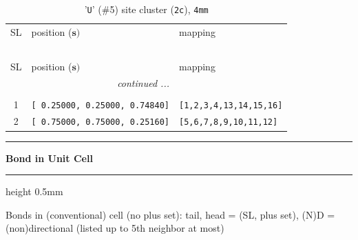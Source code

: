 \documentclass[fleqn,10pt,landscape]{jsarticle}
\begin{document}
\begin{longtable}[l]{cll}
\captionsetup{justification=raggedright, singlelinecheck=off}
\caption{'\texttt{U}' (\#5) site cluster (\texttt{2c}), \texttt{4mm}}
 \\
 \hline \hline
SL & position ($\bm{s})$ & mapping \\ \hline \endfirsthead

\multicolumn{2}{l}{\tablename\ \thetable{}} \\
 \hline \hline
SL & position ($\bm{s})$ & mapping \\ \hline \endhead

 \hline \hline
\multicolumn{2}{r}{\footnotesize\it continued ...} \\ \endfoot

 \hline \hline
\multicolumn{2}{r}{} \\ \endlastfoot

1 & \texttt{[ 0.25000, 0.25000, 0.74840]} & \texttt{[1,2,3,4,13,14,15,16]} \\ \hline
2 & \texttt{[ 0.75000, 0.75000, 0.25160]} & \texttt{[5,6,7,8,9,10,11,12]} \\
\end{longtable}
\vspace{5mm}
\noindent \rule[0.5mm]{5mm}{0.5mm}\hspace{3mm}\textbf{Bond in Unit Cell}\hspace{3mm}\leaders\hrule height 0.5mm\hfill\kern0pt
\vspace{3mm}

\noindent Bonds in (conventional) cell (no plus set): tail, head = (SL, plus set), (N)D = (non)directional (listed up to 5th neighbor at most)
\end{document}
